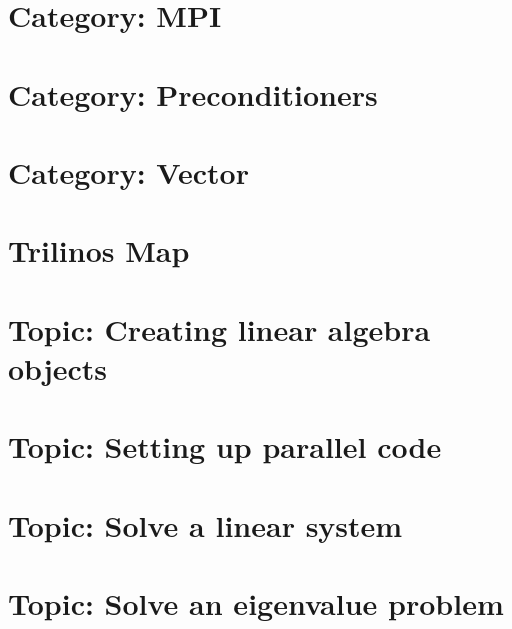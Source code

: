 \documentclass[twoside]{book}
\newcommand{\+}{\discretionary{\mbox{\scriptsize$\hookleftarrow$}}{}{}}
\begin{document}
\chapter{Category\+: M\+PI}
\label{md_markdown_category_mpi}

\chapter{Category\+: Preconditioners}
\label{md_markdown_category_preconditioners}

\chapter{Category\+: Vector}
\label{md_markdown_category_vector}

\chapter{Trilinos Map}
\label{md_markdown_map}

\chapter{Topic\+: Creating linear algebra objects}
\label{md_markdown_topic_creating_linear_algebra_objects}

\chapter{Topic\+: Setting up parallel code}
\label{md_markdown_topic_setting_up_parallel_code}

\chapter{Topic\+: Solve a linear system}
\label{md_markdown_topic_solve_a_linear_system}

\chapter{Topic\+: Solve an eigenvalue problem}
\label{md_markdown_topic_solve_an_eigenvalue_problem}

\end{document}
